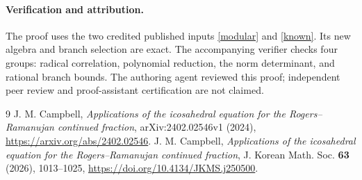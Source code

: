 \documentclass[11pt]{article}
\begin{document}
\paragraph{Verification and attribution.}
The proof uses the two credited published inputs \eqref{modular} and
\eqref{known}. Its new algebra and branch selection are exact.
The accompanying verifier checks four groups: radical correlation,
polynomial reduction, the norm determinant, and rational branch bounds.
The authoring agent reviewed this proof; independent peer review and
proof-assistant certification are not claimed.

\begin{thebibliography}{9}
 J. M. Campbell,
\emph{Applications of the icosahedral equation for the Rogers--Ramanujan
continued fraction}, arXiv:2402.02546v1 (2024),
\url{https://arxiv.org/abs/2402.02546}.
 J. M. Campbell,
\emph{Applications of the icosahedral equation for the Rogers--Ramanujan
continued fraction}, J. Korean Math. Soc. \textbf{63} (2026),
1013--1025, \url{https://doi.org/10.4134/JKMS.j250500}.
\end{thebibliography}
\end{document}
